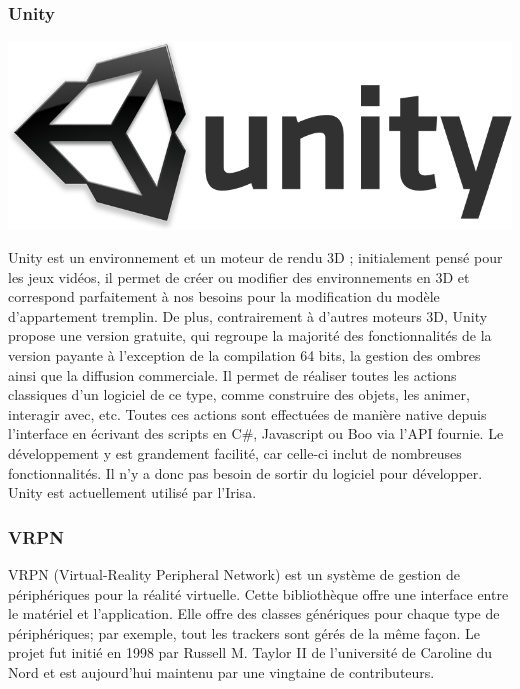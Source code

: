 	\subsubsection{Unity}
		\noindent\begin{minipage}{0.2\textwidth}
			\includegraphics[width=\linewidth]{1-PreEtude/img/unity_logo}
			\end{minipage}
			\hfill
			\begin{minipage}{0.8\textwidth}
			Unity\cite{unity} est un environnement et un moteur de rendu 3D ; initialement pensé pour les jeux vidéos, il permet de créer ou modifier des environnements en 3D et correspond parfaitement à nos besoins pour la modification du modèle d'appartement tremplin.
			De plus, contrairement à d'autres moteurs 3D, Unity propose une version gratuite, qui regroupe la majorité des fonctionnalités de la version payante à l'exception de la compilation 64 bits, la gestion des ombres ainsi que la diffusion commerciale.
			Il permet de réaliser toutes les actions classiques d'un logiciel de ce type, comme construire des objets, les animer, interagir avec, etc. Toutes ces actions sont effectuées de manière native depuis l'interface en écrivant des scripts en C\#, Javascript ou Boo via l'API fournie.
			Le développement y est grandement facilité, car celle-ci inclut de nombreuses fonctionnalités. Il n'y a donc pas besoin de sortir du logiciel pour développer.
			Unity est actuellement utilisé par l'Irisa.
		\end{minipage}


	\subsubsection{VRPN}
		\hfill
		\begin{minipage}{0.8\textwidth}
		VRPN\cite{vrpn} (Virtual-Reality Peripheral Network) est un système de gestion de périphériques pour la réalité virtuelle. Cette bibliothèque offre une interface entre le matériel et l'application. Elle offre des classes génériques pour chaque type de périphériques; par exemple, tout les trackers sont gérés de la même façon.
		Le projet fut initié en 1998 par Russell M. Taylor II de l'université de Caroline du Nord et est aujourd'hui maintenu par une vingtaine de contributeurs.
		\end{minipage}

